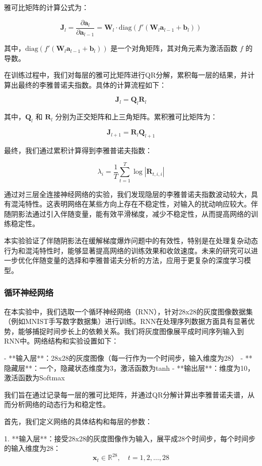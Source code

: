 \documentclass[12pt,a4paper]{amsart}
\begin{document}
雅可比矩阵的计算公式为：

\[
\mathbf{J}_l = \frac{\partial \mathbf{a}_l}{\partial \mathbf{a}_{l-1}} = \mathbf{W}_l \cdot \text{diag}(f'(\mathbf{W}_l \mathbf{a}_{l-1} + \mathbf{b}_l))
\]

其中，\(\text{diag}(f'(\mathbf{W}_l \mathbf{a}_{l-1} + \mathbf{b}_l))\) 是一个对角矩阵，其对角元素为激活函数 \(f\) 的导数。

在训练过程中，我们对每层的雅可比矩阵进行QR分解，累积每一层的结果，并计算出最终的李雅普诺夫指数。具体的计算流程如下：

\[
\mathbf{J}_l = \mathbf{Q}_l \mathbf{R}_l
\]

其中，\(\mathbf{Q}_l\) 和 \(\mathbf{R}_l\) 分别为正交矩阵和上三角矩阵。累积雅可比矩阵为：

\[
\mathbf{J}_{l+1} = \mathbf{R}_l \mathbf{Q}_{l+1}
\]

最终，我们通过累积计算得到李雅普诺夫指数：

\[
\lambda_i = \frac{1}{T} \sum_{t=1}^T \log |\mathbf{R}_{t,i,i}|
\]

通过对三层全连接神经网络的实验，我们发现隐层的李雅普诺夫指数波动较大，具有混沌特性。这表明网络在某些方向上存在不稳定性，对输入的扰动响应较大。伴随阴影法通过引入伴随变量，能有效平滑梯度，减少不稳定性，从而提高网络的训练稳定性。

本实验验证了伴随阴影法在缓解梯度爆炸问题中的有效性，特别是在处理复杂动态行为和混沌特性时，能够显著提高网络的训练效果和收敛速度。未来的研究可以进一步优化伴随变量的选择和李雅普诺夫分析的方法，应用于更复杂的深度学习模型。

\subsubsection{循环神经网络}

在本实验中，我们选取一个循环神经网络（RNN），针对28x28的灰度图像数据集（例如MNIST手写数字数据集）进行训练。RNN在处理序列数据方面具有显著优势，能够捕捉时间步长上的依赖关系。我们将灰度图像展平成时间序列输入到RNN中。网络结构和实验设置如下：

- **输入层**：28x28的灰度图像（每一行作为一个时间步，输入维度为28）
- **隐藏层**：一个，隐藏状态维度为3，激活函数为tanh
- **输出层**：维度为10，激活函数为Softmax

我们旨在通过记录每一层的雅可比矩阵，并通过QR分解计算出李雅普诺夫谱，从而分析网络的动态行为和稳定性。

首先，我们定义网络的具体结构和每层的参数：

1. **输入层**：接受28x28的灰度图像作为输入，展平成28个时间步，每个时间步的输入维度为28：
   \[
   \mathbf{x}_t \in \mathbb{R}^{28}, \quad t = 1, 2, \ldots, 28
   \]
\end{document}
